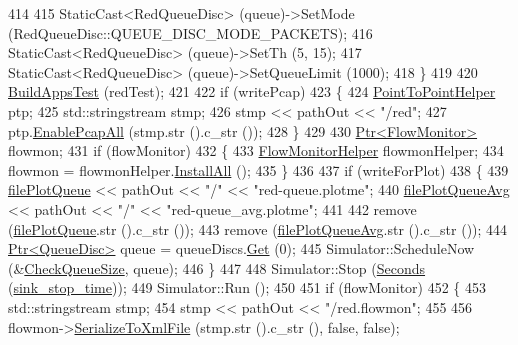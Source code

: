\begin{DoxyCode}
414 
415       StaticCast<RedQueueDisc> (queue)->SetMode (RedQueueDisc::QUEUE\_DISC\_MODE\_PACKETS);
416       StaticCast<RedQueueDisc> (queue)->SetTh (5, 15);
417       StaticCast<RedQueueDisc> (queue)->SetQueueLimit (1000);
418     \}
419 
420   \hyperlink{red-tests_8cc_a10c553e45f82b05b5cb70aaa433308b0}{BuildAppsTest} (redTest);
421 
422   \textcolor{keywordflow}{if} (writePcap)
423     \{
424       \hyperlink{classns3_1_1PointToPointHelper}{PointToPointHelper} ptp;
425       std::stringstream stmp;
426       stmp << pathOut << \textcolor{stringliteral}{"/red"};
427       ptp.\hyperlink{classns3_1_1PcapHelperForDevice_a4ab183a2512120200d4a0e5d8ececd49}{EnablePcapAll} (stmp.str ().c\_str ());
428     \}
429 
430   \hyperlink{classns3_1_1Ptr}{Ptr<FlowMonitor>} flowmon;
431   \textcolor{keywordflow}{if} (flowMonitor)
432     \{
433       \hyperlink{classns3_1_1FlowMonitorHelper}{FlowMonitorHelper} flowmonHelper;
434       flowmon = flowmonHelper.\hyperlink{classns3_1_1FlowMonitorHelper_a722b383a10c5a959576f3bfee8d4374f}{InstallAll} ();
435     \}
436 
437   \textcolor{keywordflow}{if} (writeForPlot)
438     \{
439       \hyperlink{red-tests_8cc_ab16640b35f4a9dff2c903367ff927517}{filePlotQueue} << pathOut << \textcolor{stringliteral}{"/"} << \textcolor{stringliteral}{"red-queue.plotme"};
440       \hyperlink{red-tests_8cc_a7638bc00fd3b4f02b3e4cc5ef726c915}{filePlotQueueAvg} << pathOut << \textcolor{stringliteral}{"/"} << \textcolor{stringliteral}{"red-queue\_avg.plotme"};
441 
442       \textcolor{keyword}{remove} (\hyperlink{red-tests_8cc_ab16640b35f4a9dff2c903367ff927517}{filePlotQueue}.str ().c\_str ());
443       \textcolor{keyword}{remove} (\hyperlink{red-tests_8cc_a7638bc00fd3b4f02b3e4cc5ef726c915}{filePlotQueueAvg}.str ().c\_str ());
444       \hyperlink{classns3_1_1Ptr}{Ptr<QueueDisc>} queue = queueDiscs.\hyperlink{classns3_1_1QueueDiscContainer_a236064f6321b5f0d32561bb2a14e74af}{Get} (0);
445       Simulator::ScheduleNow (&\hyperlink{red-tests_8cc_a985cd669fb2da97dadbfe6b12930df10}{CheckQueueSize}, queue);
446     \}
447 
448   Simulator::Stop (\hyperlink{group__timecivil_ga33c34b816f8ff6628e33d5c8e9713b9e}{Seconds} (\hyperlink{red-tests_8cc_a2462eef540f5b896f14d4ea7b7bb6214}{sink\_stop\_time}));
449   Simulator::Run ();
450 
451   \textcolor{keywordflow}{if} (flowMonitor)
452     \{
453       std::stringstream stmp;
454       stmp << pathOut << \textcolor{stringliteral}{"/red.flowmon"};
455 
456       flowmon->\hyperlink{classns3_1_1FlowMonitor_a4c92ccb32c95122857aefbcfc82d6746}{SerializeToXmlFile} (stmp.str ().c\_str (), \textcolor{keyword}{false}, \textcolor{keyword}{false});

\end{DoxyCode}
